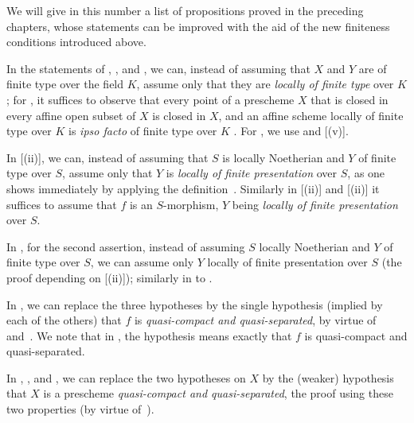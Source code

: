 We will give in this number a list of propositions proved in the preceding chapters, whose statements can be improved with the aid of the new finiteness conditions introduced above.

\begin{env}[1.7.1]
\label{IV.1.7.1}
In the statements of , , and , we can, instead of assuming that $X$ and $Y$ are of finite type over the field $K$, assume only that they are \emph{locally of finite type} over $K$; for , it suffices to observe that every point of a prescheme $X$ that is closed in every affine open subset of $X$ is closed in $X$, and an affine scheme locally of finite type over $K$ is \emph{ipso facto} of finite type over $K$ .
For , we use  and [(v)].
\end{env}

\begin{env}[1.7.2]
\label{IV.1.7.2}
In [(ii)], we can, instead of assuming that $S$ is locally Noetherian and $Y$ of finite type over $S$, assume only that $Y$ is \emph{locally of finite presentation} over $S$, as one shows immediately by applying the definition~.
Similarly in [(ii)] and [(ii)] it suffices to assume that $f$ is an $S$-morphism, $Y$ being \emph{locally of finite presentation} over $S$.
\end{env}

\begin{env}[1.7.3]
\label{IV.1.7.3}
In , for the second assertion, instead of assuming $S$ locally Noetherian and $Y$ of finite type over $S$, we can assume only $Y$ locally of finite presentation over $S$ (the proof depending on [(ii)]); similarly in  to .
\end{env}

\begin{env}[1.7.4]
\label{IV.1.7.4}
In , we can replace the three hypotheses by the single hypothesis (implied by each of the others) that $f$ is \emph{quasi-compact and quasi-separated}, by virtue of~ and~.
We note that in , the hypothesis means exactly that $f$ is quasi-compact and quasi-separated.
\end{env}

\begin{env}[1.7.5]
\label{IV.1.7.5}
In , , and , we can replace the two hypotheses on $X$ by the (weaker) hypothesis that $X$ is a prescheme \emph{quasi-compact and quasi-separated}, the proof using these two properties (by virtue of~).
\end{env}

